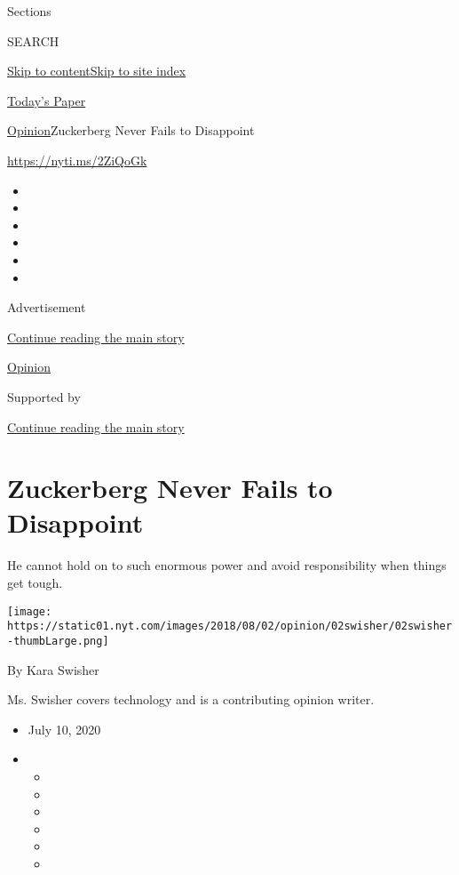 Sections

SEARCH

\protect\hyperlink{site-content}{Skip to
content}\protect\hyperlink{site-index}{Skip to site index}

\href{https://myaccount.nytimes.com/auth/login?response_type=cookie\&client_id=vi}{}

\href{https://www.nytimes.com/section/todayspaper}{Today's Paper}

\href{/section/opinion}{Opinion}\textbar{}Zuckerberg Never Fails to
Disappoint

\href{https://nyti.ms/2ZiQoGk}{https://nyti.ms/2ZiQoGk}

\begin{itemize}
\item
\item
\item
\item
\item
\item
\end{itemize}

Advertisement

\protect\hyperlink{after-top}{Continue reading the main story}

\href{/section/opinion}{Opinion}

Supported by

\protect\hyperlink{after-sponsor}{Continue reading the main story}

\hypertarget{zuckerberg-never-fails-to-disappoint}{%
\section{Zuckerberg Never Fails to
Disappoint}\label{zuckerberg-never-fails-to-disappoint}}

He cannot hold on to such enormous power and avoid responsibility when
things get tough.

\texttt{[image: https://static01.nyt.com/images/2018/08/02/opinion/02swisher/02swisher-thumbLarge.png]}

By Kara Swisher

Ms. Swisher covers technology and is a contributing opinion writer.

\begin{itemize}
\item
  July 10, 2020
\item
  \begin{itemize}
  \item
  \item
  \item
  \item
  \item
  \item
  \end{itemize}
\end{itemize}

